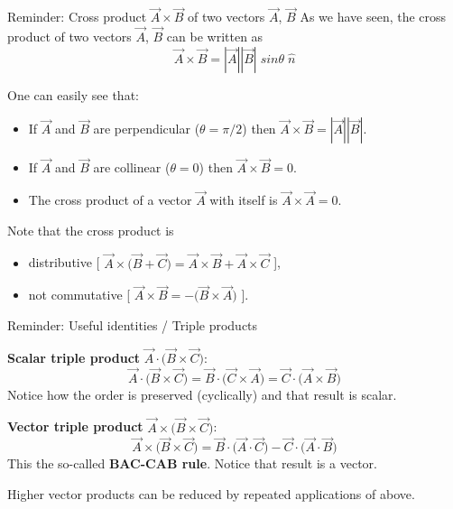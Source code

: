 {\begin{frame}{Reminder: Cross product $\vec{A} \times \vec{B}$ of two vectors $\vec{A}$, $\vec{B}$}
As we have seen, the cross product of two vectors $\vec{A}$, $\vec{B}$ can be written as
\begin{equation*}
   \vec{A} \times \vec{B} = |\vec{A}| |\vec{B}| \; sin\theta \; \hat{n}
\end{equation*}

One can easily see that:
\begin{itemize}
 \item If $\vec{A}$ and $\vec{B}$ are perpendicular ($\theta=\pi/2$) then $\vec{A} \times \vec{B} = |\vec{A}| |\vec{B}|$.
 \item If $\vec{A}$ and $\vec{B}$ are collinear ($\theta=0$) then $\vec{A} \times \vec{B} =  0$.
 \item The cross product of a vector $\vec{A}$ with itself is $\vec{A} \times \vec{A} = 0$.
\end{itemize}

\vspace{0.3cm}

Note that the cross product is
\begin{itemize}
   \item distributive [ $\vec{A} \times \Big( \vec{B} + \vec{C} \Big) = \vec{A} \times \vec{B} + \vec{A} \times \vec{C}$ ],
   \item not commutative [ $\vec{A} \times \vec{B} = - \Big( \vec{B} \times \vec{A} \Big)$ ].
\end{itemize}

\end{frame}


%
%
%

\begin{frame}{Reminder: Useful identities / Triple products}

{\bf Scalar triple product} $\vec{A} \cdot \Big( \vec{B} \times \vec{C} \Big)$:
\begin{equation*}
   \vec{A} \cdot \Big( \vec{B} \times \vec{C} \Big) =
     \vec{B} \cdot \Big( \vec{C} \times \vec{A} \Big) =
       \vec{C} \cdot \Big( \vec{A} \times \vec{B} \Big)
\end{equation*}
Notice how the order is preserved (cyclically) and that result is scalar.\\

\vspace{0.5cm}

{\bf Vector triple product} $\vec{A} \times \Big( \vec{B} \times \vec{C} \Big)$:
\begin{equation*}
   \vec{A} \times \Big( \vec{B} \times \vec{C} \Big) =
      \vec{B} \cdot \Big( \vec{A} \cdot \vec{C} \Big) -
      \vec{C} \cdot \Big( \vec{A} \cdot \vec{B} \Big)
\end{equation*}
This the so-called {\bf BAC-CAB rule}. Notice that result is a vector.\\

\vspace{0.5cm}

Higher vector products can be reduced by repeated applications of above.

\end{frame}

} %

